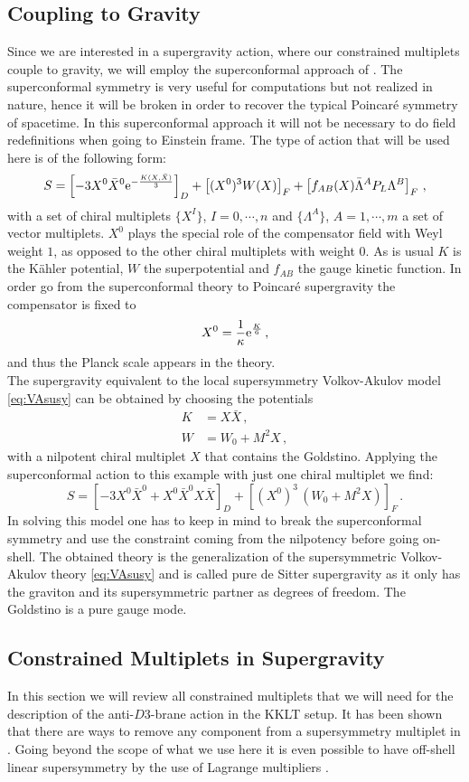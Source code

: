 \documentclass[12pt]{report}
\newcommand{\be}{\begin{equation}}
\newcommand{\ee}{\end{equation}}
\newcommand{\bea}{\begin{equation}\begin{aligned}}
\newcommand{\eea}{\end{aligned}\end{equation}}
\def\rme{{\rm e}}
\begin{document}
\subsection{Coupling to Gravity}
\label{sec:couplinggravity}
Since we are interested in a supergravity action, where our constrained multiplets couple to gravity, we will employ the superconformal approach of \cite{Freedman:2012zz}. The superconformal symmetry is very useful for computations but not realized in nature, hence it will be broken in order to recover the typical Poincar\'{e} symmetry of spacetime. In this superconformal approach it will not be necessary to do field redefinitions when going to Einstein frame. The type of action that will be used here is of the following form:
\be
S = \left[-3 X^0 \bar{X}^0 \rme^{-\frac{K(X,\bar{X})}{3}}\right]_D + \left[(X^0)^3 W (X)\right]_F + \left[f_{AB}(X) \bar{\Lambda}^A P_L \Lambda^B \right]_F\,,
\label{eq:suconfact}
\ee
with a set of chiral multiplets $\{X^I\}$, $I = 0, \cdots , n$ and $\{\Lambda^A\}$, $A=1,\cdots , m$ a set of vector multiplets. $X^0$ plays the special role of the compensator field with Weyl weight $1$, as opposed to the other chiral multiplets with weight $0$. As is usual $K$ is the Kähler potential, $W$ the superpotential and $f_{AB}$ the gauge kinetic function. In order go from the superconformal theory to Poincar\'{e} supergravity the compensator is fixed to
\be 
X^0 = \frac{1}{\kappa} \rme^{\frac{K}{6}}\,,
\ee
and thus the Planck scale appears in the theory.\\
The supergravity equivalent to the local supersymmetry Volkov-Akulov model \eqref{eq:VAsusy} can be obtained by choosing the potentials
\bea 
K &= X\bar{X}\,,\\
W &= W_0 + M^2 X\,,
\eea
with a nilpotent chiral multiplet $X$ that contains the Goldstino. Applying the superconformal action to this example with just one chiral multiplet we find:
\be 
S = \left[-3 X^0 \bar{X}^0 + X^0 \bar{X}^0 X\bar{X}\right]_D + \left[ (X^0)^3\, (W_0 + M^2 X) \right]_F\,.
\ee
In solving this model one has to keep in mind to break the superconformal symmetry and use the constraint coming from the nilpotency before going on-shell. The obtained theory is the generalization of the supersymmetric Volkov-Akulov theory \eqref{eq:VAsusy} and is called pure de Sitter supergravity \cite{Farakos:2013ih,Dudas:2015eha,Bergshoeff:2015tra,Hasegawa:2015bza,Ferrara:2015gta} as it only has the graviton and its supersymmetric partner as degrees of freedom. The Goldstino is a pure gauge mode.
\subsection{Constrained Multiplets in Supergravity}
\label{sec:constmult}
In this section we will review all constrained multiplets that we will need for the description of the anti-$D3$-brane action in the KKLT setup. It has been shown that there are ways to remove any component from a supersymmetry multiplet in \cite{DallAgata:2016syy}. Going beyond the scope of what we use here it is even possible to have off-shell linear supersymmetry by the use of Lagrange multipliers \cite{Ferrara:2016een}. 
\end{document}
